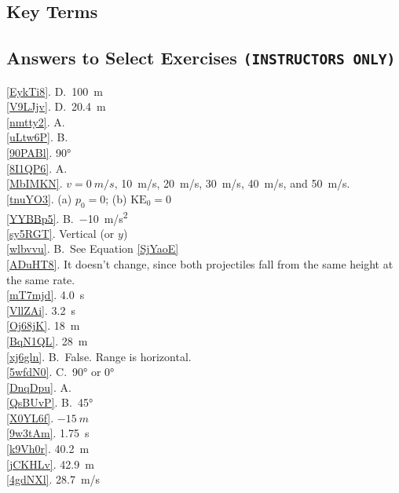 \documentclass[main-physics.tex]{subfiles}
\begin{document}
\clearpage

\subsection{Key Terms}

\printnoidxglossaries


\clearpage

\subsection{Answers to Select Exercises \texttt{(INSTRUCTORS ONLY)}}
\ref{EykTi8}. D.~\SI{100}{m}\\
\ref{V9LJjv}. D.~\SI{20.4}{m}\\
\ref{nmtty2}. A. \\
\ref{uLtw6P}. B.\\
\ref{90PABl}. \ang{90}\\
\ref{8I1QP6}. A.\\
\ref{MbIMKN}. $v = \SI{0}{m/s}$, \SI{10}{m/s}, \SI{20}{m/s}, \SI{30}{m/s}, \SI{40}{m/s}, and \SI{50}{m/s}.\\
\ref{tnuYO3}. (a) $p_0 = 0$; \hspace{1em} (b) $\text{KE}_0 = 0$\\
\ref{YYBBp5}. B.~\SI{-10}{m/s^2}\\
\ref{sy5RGT}. Vertical (or $y$)\\
\ref{wlbvvu}. B.~See Equation \eqref{SjYaoE}\\
\ref{ADuHT8}. It doesn't change, since both projectiles fall from the same height at the same rate.\\
\ref{mT7mjd}. \SI{4.0}{s}\\
\ref{VllZAi}. \SI{3.2}{s}\\
\ref{Oj68jK}. \SI{18}{m}\\
\ref{BqN1QL}. \SI{28}{m}\\
\ref{xj6gln}. B.~False. Range is horizontal.\\
\ref{5wfdN0}. C.~\ang{90} or \ang{0}\\
\ref{DnqDpu}. A.\\
\ref{QsBUvP}. B.~\ang{45}\\
\ref{X0YL6f}. $-\SI{15}{m}$\\
\ref{9w3tAm}. \SI{1.75}{s}\\
\ref{k9Vh0r}. \SI{40.2}{m}\\
\ref{jCKHLv}. \SI{42.9}{m}\\
\ref{4gdNXl}. \SI{28.7}{m/s}
\end{document}
